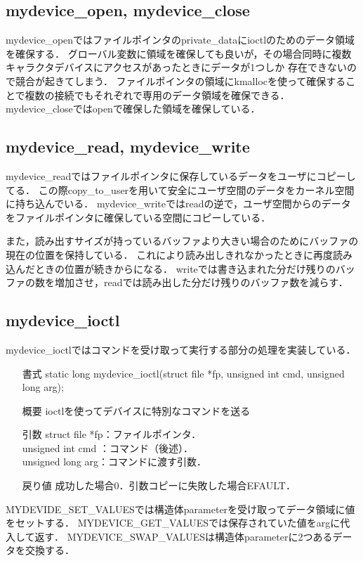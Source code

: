 \subsection{mydevice\_open, mydevice\_close}
mydevice\_openではファイルポインタのprivate\_dataにioctlのためのデータ領域を確保する．
グローバル変数に領域を確保しても良いが，その場合同時に複数キャラクタデバイスにアクセスがあったときにデータが1つしか
存在できないので競合が起きてしまう．
ファイルポインタの領域にkmallocを使って確保することで複数の接続でもそれぞれで専用のデータ領域を確保できる．
mydevice\_closeではopenで確保した領域を確保している．

\subsection{mydevice\_read, mydevice\_write}
mydevice\_readではファイルポインタに保存しているデータをユーザにコピーしてる．
この際copy\_to\_userを用いて安全にユーザ空間のデータをカーネル空間に持ち込んでいる．
mydevice\_writeではreadの逆で，ユーザ空間からのデータをファイルポインタに確保している空間にコピーしている．

また，読み出すサイズが持っているバッファより大きい場合のためにバッファの現在の位置を保持している．
これにより読み出しきれなかったときに再度読み込んだときの位置が続きからになる．
writeでは書き込まれた分だけ残りのバッファの数を増加させ，readでは読み出した分だけ残りのバッファ数を減らす．

\subsection{mydevice\_ioctl}
mydevice\_ioctlではコマンドを受け取って実行する部分の処理を実装している．
\begin{itemize}
    \item[書式] static long mydevice_ioctl(struct file *fp, unsigned int cmd, unsigned long arg);
    \item[概要] ioctlを使ってデバイスに特別なコマンドを送る
    \item[引数] struct file *fp：ファイルポインタ．\\
                unsigned int cmd ：コマンド（後述）．\\
                unsigned long arg：コマンドに渡す引数．
    \item[戻り値] 成功した場合0．引数コピーに失敗した場合EFAULT．
\end{itemize}
MYDEVIDE\_SET\_VALUESでは構造体parameterを受け取ってデータ領域に値をセットする．
MYDEVICE\_GET\_VALUESでは保存されていた値をargに代入して返す．
MYDEVICE\_SWAP\_VALUESは構造体parameterに2つあるデータを交換する．

